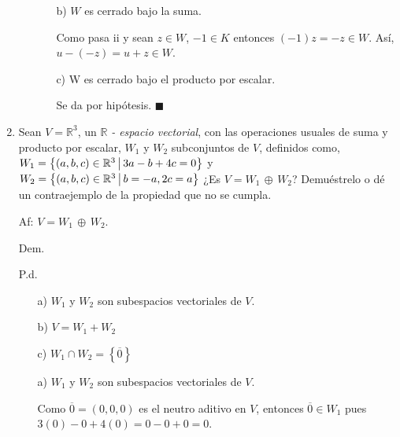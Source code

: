 \documentclass[fleqn]{article}                       %
\begin{document}
\begin{enumerate}
\begin{enumerate}
\begin{enumerate}
                \item[b)] $ W $ es cerrado bajo la suma. \par
                Como pasa ii y sean $ z \in W $, $ -1 \in K $ entonces $ (-1)z = -z \in W $. Así, $ u - (-z) = u + z \in W $.

                \item[c)] W es cerrado bajo el producto por escalar. \par
                Se da por hipótesis. $ \blacksquare $
            \end{enumerate}
        \end{enumerate}

        \item Sean $ V = \mathbb{R}^3 $, un $ \mathbb{R} $ \textsl{- espacio vectorial}, con las operaciones usuales de suma y producto por escalar, $ W_1 $ y $ W_2 $ subconjuntos de $ V $, definidos como, $ W_1 = \left \{(a,b,c) \in \mathbb{R}^3 \middle \arrowvert 3a - b + 4c = 0 \right \} $ y $ W_2 = \left \{(a,b,c) \in \mathbb{R}^3 \middle \arrowvert b=-a, 2c=a \right \} $ ¿Es $ V = W_1 \, \oplus \, W_2 $? Demuéstrelo o dé un contraejemplo de la propiedad que no se cumpla.
        
        Af: $ V = W_1 \, \oplus \, W_2 $. \par

        \hspace{2.7mm} Dem. \par

        \begin{minipage}[c]{0.7cm}
            \vspace{-1.7cm} P.d. 
        \end{minipage} \begin{minipage}[b]{9cm}
            \begin{enumerate}
                \item[a)] $ W_1 $ y $ W_2 $ son subespacios vectoriales de $ V $. 
                \item[b)] $ V = W_1 + W_2 $
                \item[c)] $ W_1 \cap W_2 = \left \{\overline{0} \right \} $
            \end{enumerate}
        \end{minipage}
        
        \begin{enumerate}
            \item[a)] $ W_1 $ y $ W_2 $ son subespacios vectoriales de $ V $. \par
            Como $ \overline{0} = (0,0,0) $ es el neutro aditivo en $ V $, entonces $ \overline{0} \in W_1 $ pues $ 3(0) - 0 + 4(0) = 0 - 0 + 0 = 0 $. \par


\end{enumerate}
\end{enumerate}
\end{document}
